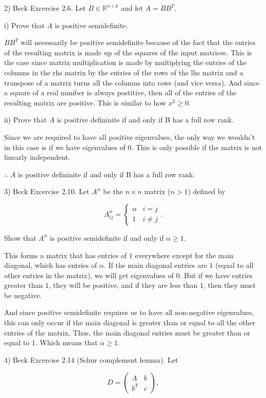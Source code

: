 \documentclass{article}
\begin{document}
2) Beck Excercise 2.6. Let $B \in \mathbb{R}^{n \times k}$
and let $A = BB^{T}$.

i) Prove that $A$ is positive semidefinite.

$BB^{T}$ will necessarily be positive semidefinite because of the fact
that the entries of the resulting matrix is made up of the squares of the
input matrices. This is the case since matrix multiplication is
made by multiplying the entries of the columns in the rhs matrix by the
entries of the rows of the lhs matrix and a transpose of a matrix
turns all the columns into rows (and vice versa). And since a
square of a real number is always postitive,
then all of the entries of the resulting matrix are positive.
This is similar to how $x^2 \geq 0$.


ii) Prove that $A$ is positive defininite if and only if
B has a full row rank.

Since we are required to have all positive eigenvalues,
the only way we wouldn't in this case is if we have eigenvalues of $0$.
This is only possible if the matrix is not linearly independent.

$\therefore$ $A$ is positive defininite if and only if
B has a full row rank.


3) Beck Excercise 2.10. Let $A^{\alpha}$ be the $n \times n$
matrix ($n > 1$) defined by

\[A_{ij}^{\alpha} = \begin{cases}
    \alpha & i = j \\
    1 & i \neq j
\end{cases}.\]

Show that $A^{\alpha}$ is positive semidefinite if
and only if $\alpha \geq 1$.

This forms a matrix that has entries of $1$ everywhere except for the main diagonal,
which has entries of $\alpha$. If the main diagonal entries are $1$ (equal to all
other entries in the matrix), we will get eigenvalues of $0$. But if we have entries
greater than $1$, they will be positive, and if they are less than $1$, then they must
be negative.

And since positive semidefinite requires us to have all non-negative eigenvalues,
this can only occur if the main diagonal is greater than or equal to all the
other entries of the matrix. Thus, the main diagonal entries must
be greater than or equal to $1$. Which means that $\alpha \geq 1$.


4) Beck Excercise 2.14 (Schur complement lemma). Let

\[D = \begin{pmatrix}
    A & b \\
    b^{T} & c
\end{pmatrix},\]
\end{document}
